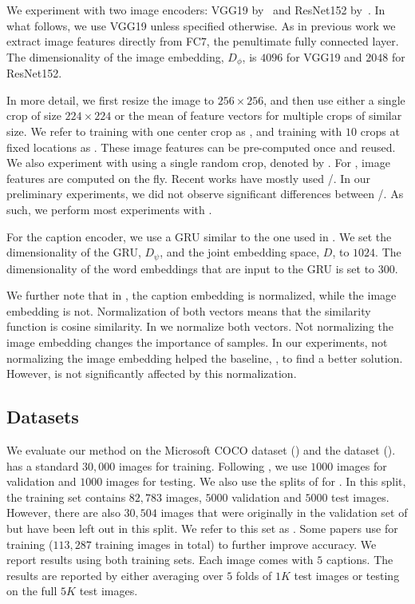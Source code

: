 We experiment with two image encoders: VGG19 by~\cite{simonyan2014very} and 
ResNet152 by~\cite{he2016deep}.  In what follows, we use VGG19 unless specified 
otherwise.  As in previous work we extract image features directly from FC$7$, 
the penultimate fully connected layer.
The dimensionality of the image embedding, $D_\phi$, 
is $4096$ for VGG19 and $2048$ for ResNet152.

In more detail, we first resize the image to $256\times256$, and then 
use either a single crop of size $224\times224$ or the mean of feature vectors 
for multiple crops of similar size. We refer to training with one center crop 
as \OC{}, and training with $10$ crops at fixed locations as \TC{}. These image 
features can be pre-computed once and reused. We also experiment with using 
a single random crop, denoted by \RC{}.  For \RC{}, image features are computed 
on the fly. Recent works have mostly used \RC{}/\TC{}. In our preliminary 
experiments, we did not observe significant differences between \RC{}/\TC{}. As 
such, we perform  most experiments with \RC{}.

For the caption encoder, we use a GRU similar to the one used in 
\cite{kiros2014unifying}.  We set the dimensionality of the GRU, $D_\psi$, and 
the joint embedding space, $D$, to $1024$. The dimensionality of the word 
embeddings that are input to the GRU is set to $300$.

We further note that in \cite{kiros2014unifying}, the caption embedding is 
normalized, while the image embedding is not. Normalization of both vectors 
means that the similarity function is cosine similarity.  In \VSEpp{} we 
normalize both vectors. Not normalizing the image embedding changes the 
importance of samples. In our experiments, not normalizing the image 
embedding  helped the baseline, \VSEz{}, to find a better solution. 
However, \VSEpp{} is not significantly affected by this normalization.

\subsection{Datasets}

We evaluate our method on the Microsoft COCO dataset (\cite{lin2014microsoft}) 
and the \fthk{} dataset (\cite{young2014image}). \fthk{} has a standard 
$30,000$ images for training. Following \cite{karpathy2015deep}, we use $1000$ 
images for validation and $1000$  images for testing. We also use the splits of 
\cite{karpathy2015deep} for \coco{}. In this split, the training set contains 
$82,783$ images, $5000$ validation and $5000$ test images.  However, there are 
also $30,504$ images that were originally in the validation set of \coco{} but 
have been left out in this split. We refer to this set as \RV{}. Some papers 
use \RV{} for training ($113,287$ training images in total) to further improve 
accuracy.  We report results using both training sets.  Each image comes with 
$5$ captions.  The results are reported by either averaging over $5$ folds of 
$1K$ test images or testing on the full $5K$ test images.




